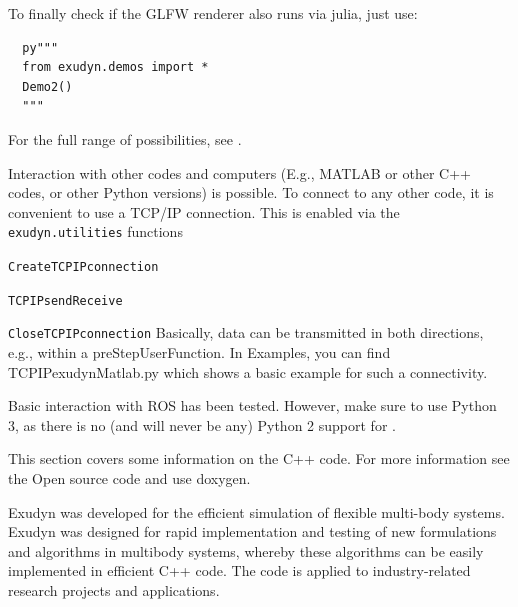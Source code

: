 To finally check if the GLFW renderer also runs via julia, just use:
\begin{lstlisting}
  py"""
  from exudyn.demos import *
  Demo2()
  """
\end{lstlisting}
For the full range of possibilities, see .


%
Interaction with other codes and computers (E.g., MATLAB or other C++ codes, or other Python versions)
is possible. 
To connect to any other code, it is convenient to use a TCP/IP connection. This is enabled via 
the \texttt{exudyn.utilities} functions
\bi
\item \texttt{CreateTCPIPconnection}
\item \texttt{TCPIPsendReceive}
\item \texttt{CloseTCPIPconnection}
\ei
Basically, data can be transmitted in both directions, e.g., within a preStepUserFunction. In Examples, you can find 
 TCPIPexudynMatlab.py which shows a basic example for such a connectivity.

%
Basic interaction with ROS has been tested. However, make sure to use Python 3, as there is no (and will never be any) Python 2
support for \codeName.






This section covers some information on the C++ code. For more information see the Open source code and use doxygen.

Exudyn was developed for the efficient simulation of flexible multi-body systems. Exudyn was designed for rapid implementation and testing of new formulations and algorithms in multibody systems, whereby these algorithms can be easily implemented in efficient C++ code. The code is applied to industry-related research projects and applications.

